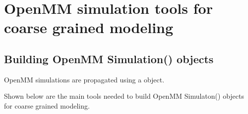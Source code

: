 \documentclass[letterpaper,12pt,english,openany,oneside]{sphinxmanual}
\begin{document}
\chapter{OpenMM simulation tools for coarse grained modeling}
\label{\detokenize{simulation:openmm-simulation-tools-for-coarse-grained-modeling}}\label{\detokenize{simulation::doc}}

\section{Building OpenMM Simulation() objects}
\label{\detokenize{simulation:building-openmm-simulation-objects}}
OpenMM simulations are propagated using a  object.

Shown below are the main tools needed to build OpenMM Simulaton() objects for coarse grained modeling.

\label{\detokenize{simulation:module-simulation.tools}}
\end{document}
